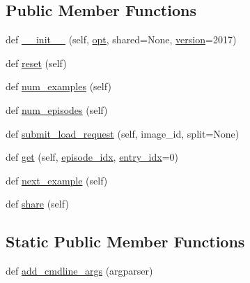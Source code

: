 \subsection*{Public Member Functions}
\begin{DoxyCompactItemize}
\item 
def \hyperlink{classparlai_1_1tasks_1_1coco__caption_1_1agents_1_1DefaultTeacher_a3260b2d2bdda6b791125190b24236ae9}{\+\_\+\+\_\+init\+\_\+\+\_\+} (self, \hyperlink{classparlai_1_1core_1_1agents_1_1Teacher_a3ce6243860ce978a897922863ed32fa4}{opt}, shared=None, \hyperlink{classparlai_1_1tasks_1_1coco__caption_1_1agents_1_1DefaultTeacher_a5945ea0eff083c797fa85d1174c1a2e3}{version}=\textquotesingle{}2017\textquotesingle{})
\item 
def \hyperlink{classparlai_1_1tasks_1_1coco__caption_1_1agents_1_1DefaultTeacher_ac3b29ac1add9d464b365d472caafcbaa}{reset} (self)
\item 
def \hyperlink{classparlai_1_1tasks_1_1coco__caption_1_1agents_1_1DefaultTeacher_abc57dc81be0b084f28af97aa62c2d531}{num\+\_\+examples} (self)
\item 
def \hyperlink{classparlai_1_1tasks_1_1coco__caption_1_1agents_1_1DefaultTeacher_a688ac5a25bb6bb79b57550ecdec0eab1}{num\+\_\+episodes} (self)
\item 
def \hyperlink{classparlai_1_1tasks_1_1coco__caption_1_1agents_1_1DefaultTeacher_ac6b0eb2ddf6dcf03a750221b886ffd9b}{submit\+\_\+load\+\_\+request} (self, image\+\_\+id, split=None)
\item 
def \hyperlink{classparlai_1_1tasks_1_1coco__caption_1_1agents_1_1DefaultTeacher_ac50d86244a0030b91090d7c1ef4d7c72}{get} (self, \hyperlink{classparlai_1_1core_1_1teachers_1_1FixedDialogTeacher_afd4ebab8063eb42d182d30a1a41f133e}{episode\+\_\+idx}, \hyperlink{classparlai_1_1core_1_1teachers_1_1FixedDialogTeacher_ae3201b15f3c3b46a2f3511bad9b43e7d}{entry\+\_\+idx}=0)
\item 
def \hyperlink{classparlai_1_1tasks_1_1coco__caption_1_1agents_1_1DefaultTeacher_a836bf6068d0155b03bcc796c77480f1f}{next\+\_\+example} (self)
\item 
def \hyperlink{classparlai_1_1tasks_1_1coco__caption_1_1agents_1_1DefaultTeacher_a9b7c2be6b8702f1aec7087a568b3439c}{share} (self)
\end{DoxyCompactItemize}
\subsection*{Static Public Member Functions}
\begin{DoxyCompactItemize}
\item 
def \hyperlink{classparlai_1_1tasks_1_1coco__caption_1_1agents_1_1DefaultTeacher_a5eedc8754921674002b5e4e89899027f}{add\+\_\+cmdline\+\_\+args} (argparser)
\end{DoxyCompactItemize}
